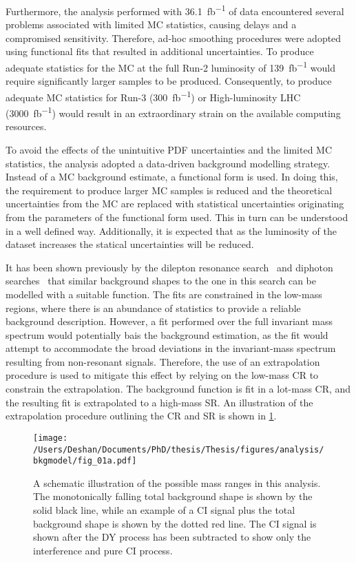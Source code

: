 Furthermore, the analysis performed with \SI{36.1}{\femto\barn^{-1}} of data encountered several problems associated with limited MC statistics, causing delays and a compromised sensitivity. Therefore, ad-hoc smoothing procedures were adopted using functional fits that resulted in additional uncertainties. To produce adequate statistics for the MC at the full Run-2 luminosity of \SI{139}{\femto\barn^{-1}} would require significantly larger samples to be produced. Consequently, to produce adequate MC statistics for Run-3 (\SI{300}{\femto\barn^{-1}}) or High-luminosity LHC (\SI{3000}{\femto\barn^{-1}}) would result in an extraordinary strain on the available computing resources. 

To avoid the effects of the unintuitive PDF uncertainties and the limited MC statistics, the analysis adopted a data-driven background modelling strategy. Instead of a MC background estimate, a functional form is used. In doing this, the requirement to produce larger MC samples is reduced and the theoretical uncertainties from the MC are replaced with statistical uncertainties originating from the parameters of the functional form used. This in turn can be understood in a well defined way. Additionally, it is expected that as the luminosity of the dataset increases the statical uncertainties will be reduced. 

It has been shown previously by the dilepton resonance search~\cite{Aad:2019fac} and diphoton searches~\cite{Aaboud:2016tru,Aaboud:2017yyg} that similar background shapes to the one in this search can be modelled with a suitable function. The fits are constrained in the low-mass regions, where there is an abundance of statistics to provide a reliable background description. However, a fit performed over the full invariant mass spectrum would potentially bais the background estimation, as the fit would attempt to accommodate the broad deviations in the invariant-mass spectrum resulting from non-resonant signals. Therefore, the use of an extrapolation procedure is used to mitigate this effect by relying on the low-mass CR to constrain the extrapolation. The background function is fit in a lot-mass CR, and the resulting fit is extrapolated to a high-mass SR. An illustration of the extrapolation procedure outlining the CR and SR is shown in \cref{fig:bkgmodel:ranges}.

\begin{figure}[!htpb]
    \centering
    \texttt{[image: /Users/Deshan/Documents/PhD/thesis/Thesis/figures/analysis/bkgmodel/fig\_01a.pdf]} 
    \caption[A schematic illustration of the possible mass ranges in this analysis.]{A schematic illustration of the possible mass ranges in this analysis.
    The monotonically falling total background shape is shown by the solid black line, while an example of a CI signal plus the total background shape is shown by the dotted red line. The CI signal is shown after the DY process has been subtracted to show only the interference and pure CI process.}
    \label{fig:bkgmodel:ranges}
\end{figure}

